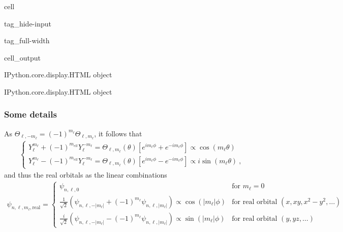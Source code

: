 \documentclass[letterpaper,10pt,english]{jupyterBook}
\begin{document}
\begin{sphinxuseclass}{cell}
\begin{sphinxuseclass}{tag_hide-input}
\begin{sphinxuseclass}{tag_full-width}
\begin{sphinxVerbatimOutput}
\begin{sphinxuseclass}{cell_output}
\begin{sphinxVerbatim}[commandchars=\\\{\}]
\PYGZlt{}IPython.core.display.HTML object\PYGZgt{}
\end{sphinxVerbatim}

\begin{sphinxVerbatim}[commandchars=\\\{\}]
\PYGZlt{}IPython.core.display.HTML object\PYGZgt{}
\end{sphinxVerbatim}

\end{sphinxuseclass}\end{sphinxVerbatimOutput}

\end{sphinxuseclass}
\end{sphinxuseclass}
\end{sphinxuseclass}

\subsubsection{Some details}
\label{\detokenize{ch/quantum-mechanics/atom-models/schrodinger-gallery:some-details}}\label{\detokenize{ch/quantum-mechanics/atom-models/schrodinger-gallery:quantum-mechanics-atom-models-schrodinger-gallery-details}}
\sphinxAtStartPar
As \(\Theta_{\ell, -m_\ell} = (-1)^{m_{\ell}} \Theta_{\ell, m_\ell}\), it follows that
\begin{equation*}
\begin{split}\begin{cases}
  Y_{\ell}^{m_\ell} + (-1)^{m_{ell}} Y_{\ell}^{-m_\ell}
  = \Theta_{\ell, m_{\ell}}(\theta) \left[ e^{i m_{\ell} \phi} + e^{-i m_{\ell} \phi} \right] \propto \cos( m_{\ell} \theta ) \\
  Y_{\ell}^{m_\ell} - (-1)^{m_{ell}} Y_{\ell}^{-m_\ell}
  = \Theta_{\ell, m_{\ell}}(\theta) \left[ e^{i m_{\ell} \phi} - e^{-i m_{\ell} \phi} \right] \propto i \sin( m_{\ell} \theta ) \ ,
\end{cases}\end{split}
\end{equation*}
\sphinxAtStartPar
and thus the real orbitals as the linear combinations
\begin{equation*}
\begin{split}\psi_{n,\ell,m_\ell, \text{real}} = \begin{cases}  \psi_{n,\ell,0} & \text{for } m_\ell = 0 \\ \frac{1}{\sqrt{2}} \left( \psi_{n,\ell,-\vert{}m_\ell\vert{}} + (-1)^{m_\ell} \psi_{n,\ell,\vert{}m_\ell\vert{}} \right) \propto \cos(\vert{}m_\ell\vert{}\phi) & \text{for } \text{real orbital } (x, xy, x^2-y^2, \dots) \\ \frac{i}{\sqrt{2}} \left( \psi_{n,\ell,-\vert{}m_\ell\vert{}} - (-1)^{m_\ell} \psi_{n,\ell,\vert{}m_\ell\vert{}} \right) \propto \sin(\vert{}m_\ell\vert{}\phi) & \text{for } \text{real orbital } (y, yz, \dots) \end{cases}\end{split}
\end{equation*}
\end{document}
